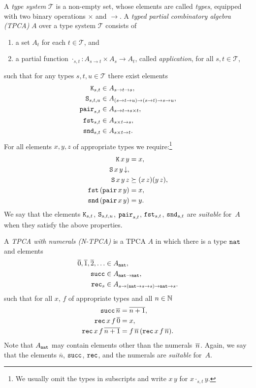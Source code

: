 A \emph{type system} $\mathcal{T}$ is a non-empty set, whose elements
are called \emph{types}, equipped with two binary operations $\times$
and $\to$. A \emph{typed partial combinatory algebra (TPCA)} $A$ over
a type system $\mathcal{T}$ consists of
%
\begin{enumerate}
\item a set $A_t$ for each $t \in \mathcal{T}$, and
\item a partial function $\cdot_{s,t} : A_{s \to t} \times A_s \to
  A_t$, called \emph{application}, for all $s, t \in \mathcal{T}$,
\end{enumerate}
%
such that for any types $s, t, u \in \mathcal{T}$ there exist elements
%
\begin{align*}
  \mathtt{K}_{s,t} &\in A_{s \to t \to s}, \\
  \mathtt{S}_{s,t,u} &\in A_{(s \to t \to u) \to (s \to t) \to s \to u}, \\
  \mathtt{pair}_{s,t} &\in A_{s \to t \to s \times t}, \\
  \mathtt{fst}_{s,t} &\in A_{s \times t \to s}, \\
  \mathtt{snd}_{s,t} &\in A_{s \times t \to t}.
\end{align*}
%
For all elements $x, y, z$ of appropriate types we require:\footnote{We
  usually omit the types in subscripts and write $x \, y$ for $x
  \cdot_{s,t} y$.}
%
\begin{align*}
  \mathtt{K} \, x \, y &= x, \\
  \mathtt{S} \, x \, y\,{\downarrow}, & \\
  \mathtt{S} \, x \, y \, z &\succeq  (x \, z) (y \, z), \\
  \mathtt{fst} \, (\mathtt{pair} \, x \, y) &= x, \\
  \mathtt{snd} \, (\mathtt{pair} \, x \, y) &= y.
\end{align*}
%
We say that the elements $\mathtt{K}_{s,t}$, $\mathtt{S}_{s,t,u}$,
$\mathtt{pair}_{s,t}$, $\mathtt{fst}_{s,t}$, $\mathtt{snd}_{s,t}$ are
\emph{suitable} for~$A$ when they satisfy the above properties.

A \emph{TPCA with numerals (N-TPCA)} is a TPCA $A$ in which there is a
type $\mathtt{nat}$ and elements
%
\begin{align*}
  \overline{0}, \overline{1}, \overline{2}, \ldots &\in A_{\mathtt{nat}}, \\
  \mathtt{succ} &\in A_{\mathtt{nat} \to \mathtt{nat}}, \\
  \mathtt{rec}_s &\in A_{s \to (\mathtt{nat} \to s \to s) \to \mathtt{nat} \to s}.
\end{align*}
%
such that for all $x$, $f$ of appropriate types and all $n \in \mathbb{N}$
%
\begin{align*}
  \mathtt{succ} \, \overline{n} &= \overline{n + 1}, \\
  \mathtt{rec} \, x \, f \, \overline{0} &= x, \\
  \mathtt{rec} \, x \, f \, \overline{n+1} &=
  f \, \overline{n} \, (\mathtt{rec} \, x \, f \, \overline{n}).
\end{align*}
%
Note that $A_{\mathtt{nat}}$ may contain elements other than the
numerals~$\overline{n}$. Again, we say that the elements
$\overline{n}$, $\mathtt{succ}$, $\mathtt{rec}$, and the numerals are
\emph{suitable} for~$A$.

